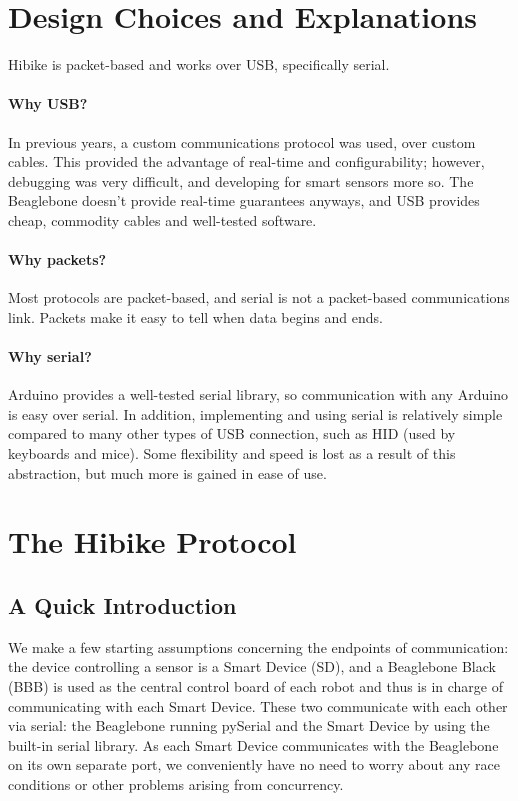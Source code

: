 \documentclass[12pt]{book}
\begin{document}
\section{Design Choices and Explanations}
Hibike is packet-based and works over USB, specifically serial.

\paragraph{Why USB?}

In previous years, a custom communications protocol was used, over custom cables.
This provided the advantage of real-time and configurability; however, debugging was very difficult,
and developing for smart sensors more so. The Beaglebone doesn't provide real-time guarantees
anyways, and USB provides cheap, commodity cables and well-tested software.

\paragraph{Why packets?}

Most protocols are packet-based, and serial is not a packet-based communications link.
Packets make it easy to tell when data begins and ends.

\paragraph{Why serial?}

Arduino provides a well-tested serial library, so communication with any Arduino is easy
over serial. In addition, implementing and using serial is relatively simple compared
to many other types of USB connection, such as HID (used by keyboards and mice). Some
flexibility and speed is lost as a result of this abstraction, but much more is gained
in ease of use.

\section{The Hibike Protocol}
\subsection{A Quick Introduction}
We make a few starting assumptions concerning the endpoints of communication: the device controlling a sensor is a Smart Device (SD), and a Beaglebone Black (BBB) is used as the central control board of each robot and thus is in charge of communicating with each Smart Device. These two communicate with each other via serial: the Beaglebone running pySerial and the Smart Device by using the built-in serial library. As each Smart Device communicates with the Beaglebone on its own separate port, we conveniently have no need to worry about any race conditions or other problems arising from concurrency.
\end{document}
